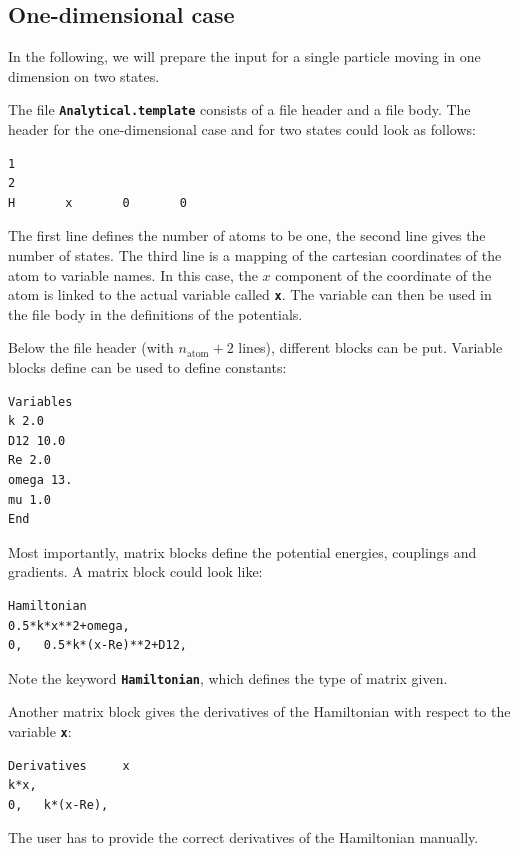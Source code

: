 \documentclass[a4paper,11pt,DIV=15,openany]{scrbook}
\newcommand{\ttt}[1]{\textbf{\texttt{#1}}}
\begin{document}
\subsection{One-dimensional case}

In the following, we will prepare the input for a single particle moving in one dimension on two states.

The file \ttt{Analytical.template} consists of a file header and a file body. The header for the one-dimensional case and for two states could look as follows:
\begin{oframed}
\footnotesize\begin{Verbatim}[commandchars=\\\{\}]
1
2
H       x       0       0
\end{Verbatim}
\end{oframed}
The first line defines the number of atoms to be one, the second line gives the number of states. The third line is a mapping of the cartesian coordinates of the atom to variable names. In this case, the $x$ component of the coordinate of the atom is linked to the actual variable called \ttt{x}. The variable can then be used in the file body in the definitions of the potentials.

Below the file header (with $n_\text{atom}+2$ lines), different blocks can be put. Variable blocks define can be used to define constants:
\begin{oframed}
\footnotesize\begin{Verbatim}[commandchars=\\\{\}]
Variables
k 2.0
D12 10.0
Re 2.0
omega 13.
mu 1.0
End
\end{Verbatim}
\end{oframed}

Most importantly, matrix blocks define the potential energies, couplings and gradients. A matrix block could look like:
\begin{oframed}
\footnotesize\begin{Verbatim}[commandchars=\\\{\}]
Hamiltonian
0.5*k*x**2+omega,
0,   0.5*k*(x-Re)**2+D12,
\end{Verbatim}
\end{oframed}
Note the keyword \ttt{Hamiltonian}, which defines the type of matrix given.

Another matrix block gives the derivatives of the Hamiltonian with respect to the variable \ttt{x}:
\begin{oframed}
\footnotesize\begin{Verbatim}[commandchars=\\\{\}]
Derivatives     x
k*x,
0,   k*(x-Re),
\end{Verbatim}
\end{oframed}
The user has to provide the correct derivatives of the Hamiltonian manually.
\end{document}
